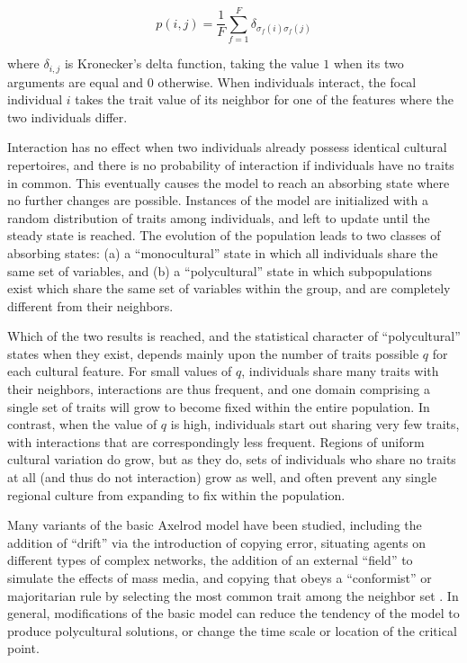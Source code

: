 \documentclass[graybox,natbib]{svmult}
\begin{document}
\begin{equation}\label{eq:axelrod}p(i,j) = \frac{1}{F} \sum_{f=1}^{F} \delta_{\sigma_f(i)\sigma_f(j)}\end{equation}

where $\delta_{i,j}$ is Kronecker's delta function, taking the value $1$
when its two arguments are equal and $0$ otherwise. When individuals
interact, the focal individual $i$ takes the trait value of its neighbor
for one of the features where the two individuals differ.

Interaction has no effect when two individuals already possess identical
cultural repertoires, and there is no probability of interaction if
individuals have no traits in common. This eventually causes the model
to reach an absorbing state where no further changes are possible.
Instances of the model are initialized with a random distribution of
traits among individuals, and left to update until the steady state is
reached. The evolution of the population leads to two classes of
absorbing states: (a) a ``monocultural'' state in which all individuals
share the same set of variables, and (b) a ``polycultural'' state in
which subpopulations exist which share the same set of variables within
the group, and are completely different from their neighbors.

Which of the two results is reached, and the statistical character of
``polycultural'' states when they exist, depends mainly upon the number
of traits possible $q$ for each cultural feature. For small values of
$q$, individuals share many traits with their neighbors, interactions
are thus frequent, and one domain comprising a single set of traits will
grow to become fixed within the entire population. In contrast, when the
value of $q$ is high, individuals start out sharing very few traits,
with interactions that are correspondingly less frequent. Regions of
uniform cultural variation do grow, but as they do, sets of individuals
who share no traits at all (and thus do not interaction) grow as well,
and often prevent any single regional culture from expanding to fix
within the population.

Many variants of the basic Axelrod model have been studied, including
the addition of ``drift'' via the introduction of copying error,
situating agents on different types of complex networks, the addition of
an external ``field'' to simulate the effects of mass media, and copying
that obeys a ``conformist'' or majoritarian rule by selecting the most
common trait among the neighbor set
\citep{castellano2000nonequilibrium, de2009effects, flache2006sustains, GonzalezAvella:2007p6910, GonzalezAvella:2007p6912, gonzalez2005nonequilibrium, gonzalez2006local, Klemm:2003p7031, Klemm:2003p7112, Klemm:2005tb, Lanchier:2010p16999, Lanchier:2012ur}.
In general, modifications of the basic model can reduce the tendency of
the model to produce polycultural solutions, or change the time scale or
location of the critical point.
\end{document}
